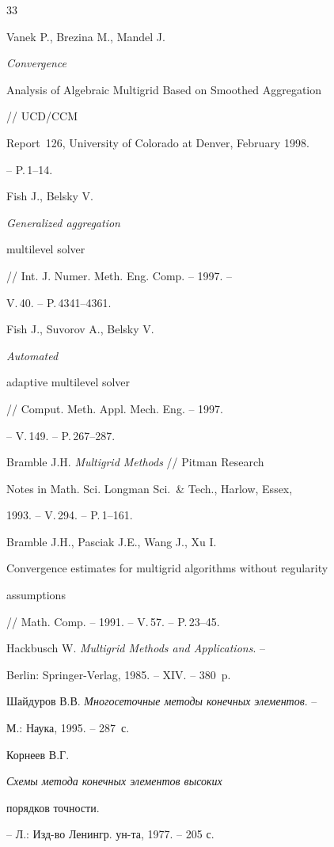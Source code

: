 \begin{thebibliography}{33}
\bibitem{[31]} %


Vanek P., Brezina M., Mandel J. {\it Convergence


Analysis of Algebraic Multigrid Based on Smoothed Aggregation} // UCD/CCM


Report \No\,126, University of Colorado at Denver, February 1998.


-- P.\,1--14.


\bibitem{[13]} %


Fish J., Belsky V. {\it Generalized aggregation


multilevel solver} // Int. J. Numer. Meth. Eng. Comp. -- 1997. --


V.\,40. -- P.\,4341--4361.


\bibitem{[14]} %


Fish J., Suvorov A., Belsky V. {\it Automated


adaptive multilevel solver} // Comput. Meth. Appl. Mech. Eng. -- 1997.


-- V.\,149. -- P.\,267--287.


\bibitem{[3]} %


Bramble J.H. {\it Multigrid Methods} // Pitman Research


Notes in Math. Sci. Longman Sci.~\& Tech., Harlow, Essex,


1993. -- V.\,294. -- P.\,1--161.


\bibitem{[4]} %


Bramble J.H., Pasciak J.E., Wang J., Xu I. {\it


Convergence estimates for multigrid algorithms without regularity


assumptions} // Math. Comp. -- 1991. -- V.\,57. -- P.\,23--45.


\bibitem{[17]} %


Hackbusch W. {\it Multigrid Methods and Applications}. --


Berlin: Springer-Verlag, 1985. -- XIV. -- 380~p.


\bibitem{[27]} %


Шайдуров В.В. {\it Многосеточные методы конечных элементов}. --


М.: Наука, 1995. -- 287~с.


\bibitem{[21]} %


Корнеев В.Г. {\em Схемы метода конечных элементов высоких


порядков точности.} -- Л.: Изд-во Ленингр. ун-та, 1977. -- 205 с.


\bibitem{[20]} %



\end{thebibliography}
